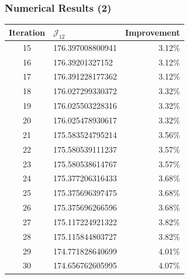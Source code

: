 \documentclass[10pt,xcolor=table,english]{beamer}   %
\begin{document}
\begin{frame}
    \frametitle{Numerical Results (2)}
    \begin{table}
        \centering
        \begin{tabular}{|c|l|r|}
            \hline
            \textbf{Iteration} & $\mathcal{J}_{12}$ & Improvement \\
            \hline
            15 & 176.397008800941 & 3.12\% \\
            \hline          
            16 & 176.39201327152 & 3.12\% \\
            \hline
            17 & 176.391228177362 & 3.12\% \\
            \hline
            18 & 176.027299330372 & 3.32\% \\
            \hline
            19 & 176.025503228316 & 3.32\% \\
            \hline
            20 & 176.025478930617 & 3.32\% \\
            \hline
            21 & 175.583524795214 & 3.56\% \\
            \hline
            22 & 175.580539111237 & 3.57\% \\
            \hline
            23 & 175.580538614767 & 3.57\% \\
            \hline
            24 & 175.377206316433 & 3.68\% \\
            \hline
            25 & 175.375696397475 & 3.68\% \\
            \hline
            26 & 175.375696266596 & 3.68\% \\
            \hline
            27 & 175.117224921322 & 3.82\% \\
            \hline
            28 & 175.115844803727 & 3.82\% \\
            \hline
            29 & 174.771828640699 & 4.01\% \\
            \hline
            30 & 174.656762605995 & 4.07\% \\
            \hline
        \end{tabular}
    \end{table}
\end{frame}
\end{document}
